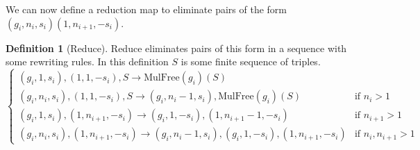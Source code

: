 \documentclass[12pt]{article} %
\theoremstyle{definition}
\theoremstyle{definition}
\theoremstyle{definition}
\theoremstyle{definition}
\theoremstyle{definition}
\newtheorem{defn}[theorem]{Definition}
\theoremstyle{definition}
\begin{document}
We can now define a reduction map to eliminate pairs of the form
 $(g_i, n_i, s_i)(1, n_{i+1}, -s_i)$.
\begin{defn}[Reduce]
  Reduce eliminates pairs of this form in a sequence with some rewriting rules.
  In this definition $S$ is some finite sequence of triples.
  \begin{equation}
    \begin{cases}
    (g_i, 1, s_i), (1, 1, -s_i), S \to \text{MulFree}(g_i)(S) \\
    (g_i, n_i, s_i), (1, 1, -s_i), S \to (g_i, n_i - 1, s_i),
      \text{MulFree}(g_i)(S) & \text{if } n_i > 1\\
    (g_i, 1, s_i), (1, n_{i+1}, -s_i) \to
      (g_i, 1, -s_i), (1, n_{i+1} - 1, -s_i) &\text{if } n_{i+1} > 1 \\
    (g_i, n_i, s_i), (1, n_{i+1}, -s_i) \to
    (g_i, n_i - 1, s_i), (g_i, 1, -s_i), (1, n_{i + 1}, -s_i) &
      \text{if } n_i, n_{i+1} > 1
    \end{cases}
  \end{equation}

\end{defn}

\end{document}

